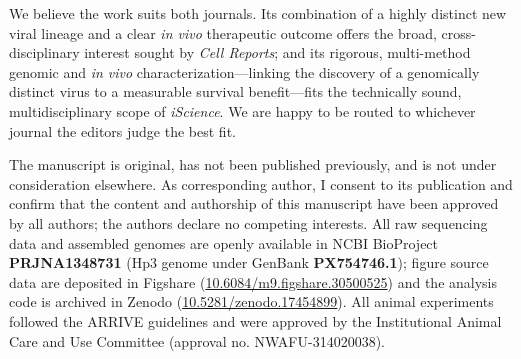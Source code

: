 \documentclass[11pt,a4paper]{article}
\begin{document}
We believe the work suits both journals. Its combination of a highly distinct
new viral lineage and a clear \emph{in vivo} therapeutic outcome offers the
broad, cross-disciplinary interest sought by \emph{Cell Reports}; and its
rigorous, multi-method genomic and \emph{in vivo} characterization---linking
the discovery of a genomically distinct virus to a measurable survival
benefit---fits the technically sound, multidisciplinary scope of
\emph{iScience}. We are happy to be routed to whichever journal the editors
judge the best fit.

The manuscript is original, has not been published previously, and is not under
consideration elsewhere. As corresponding author, I consent to its publication
and confirm that the content and authorship of this manuscript have been
approved by all authors; the authors declare no competing interests. All raw
sequencing data and assembled genomes are openly available in NCBI BioProject
\textbf{PRJNA1348731} (Hp3 genome under GenBank \textbf{PX754746.1}); figure
source data are deposited in Figshare
(\href{https://doi.org/10.6084/m9.figshare.30500525}{10.6084/m9.figshare.30500525})
and the analysis code is archived in Zenodo
(\href{https://doi.org/10.5281/zenodo.17454899}{10.5281/zenodo.17454899}).
All animal experiments followed the ARRIVE guidelines and were approved by the
Institutional Animal Care and Use Committee (approval no. NWAFU-314020038).
\end{document}
